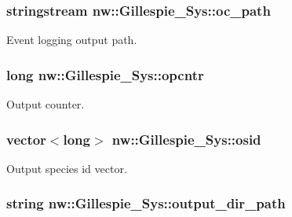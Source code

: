 \hypertarget{classnw_1_1_gillespie___sys_ab1709cadc7e452ec3834ac66a3354203}{
\subsubsection[{oc\+\_\+path}]{\setlength{\rightskip}{0pt plus 5cm}stringstream nw\+::\+Gillespie\+\_\+\+Sys\+::oc\+\_\+path\hspace{0.3cm}{\ttfamily [private]}}}\label{classnw_1_1_gillespie___sys_ab1709cadc7e452ec3834ac66a3354203}


Event logging output path. 

\hypertarget{classnw_1_1_gillespie___sys_a31f847a062a1cdc9b4a7eed103447da7}{
\subsubsection[{opcntr}]{\setlength{\rightskip}{0pt plus 5cm}long nw\+::\+Gillespie\+\_\+\+Sys\+::opcntr\hspace{0.3cm}{\ttfamily [private]}}}\label{classnw_1_1_gillespie___sys_a31f847a062a1cdc9b4a7eed103447da7}


Output counter. 

\hypertarget{classnw_1_1_gillespie___sys_a138ba3dc15d538a31dbc7c1200bc5637}{
\subsubsection[{osid}]{\setlength{\rightskip}{0pt plus 5cm}vector$<$long$>$ nw\+::\+Gillespie\+\_\+\+Sys\+::osid\hspace{0.3cm}{\ttfamily [private]}}}\label{classnw_1_1_gillespie___sys_a138ba3dc15d538a31dbc7c1200bc5637}


Output species id vector. 

\hypertarget{classnw_1_1_gillespie___sys_a07aa57de819107467a13af8ceadb4be9}{
\subsubsection[{output\+\_\+dir\+\_\+path}]{\setlength{\rightskip}{0pt plus 5cm}string nw\+::\+Gillespie\+\_\+\+Sys\+::output\+\_\+dir\+\_\+path\hspace{0.3cm}{\ttfamily [private]}}}\label{classnw_1_1_gillespie___sys_a07aa57de819107467a13af8ceadb4be9}


